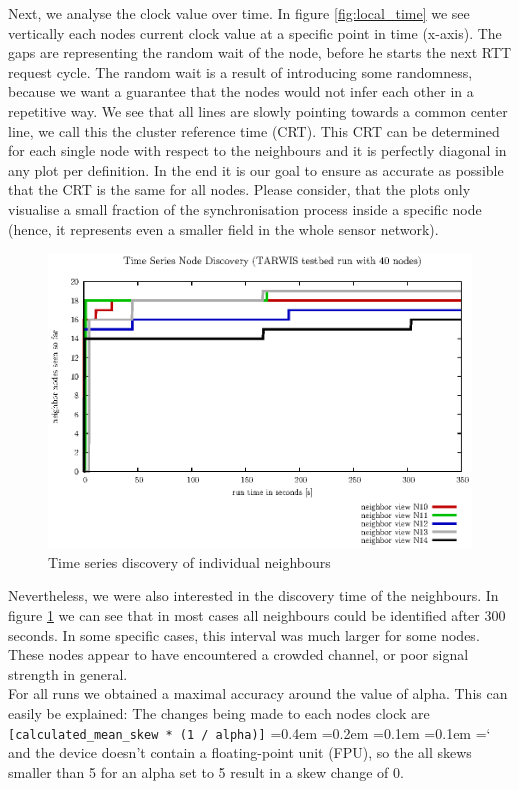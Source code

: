 \documentclass{llncs}
\newcommand{\code}[1]{%
	\texttt{#1}%
	\fontdimen2\font=0.4em
	\fontdimen3\font=0.2em
	\fontdimen4\font=0.1em
	\fontdimen7\font=0.1em
	\hyphenchar\font=`\-
}
\begin{document}
\noindent Next, we analyse the clock value over time. In figure \ref{fig:local_time} we see vertically each nodes current clock value at a specific point in time (x-axis). The gaps are representing the random wait of the node, before he starts the next RTT request cycle. The random wait is a result of introducing some randomness, because we want a guarantee that the nodes would not infer each other in a repetitive way. We see that all lines are slowly pointing towards a common center line, we call this the cluster reference time (CRT). This CRT can be determined for each single node with respect to the neighbours and it is perfectly diagonal in any plot per definition. In the end it is our goal to ensure as accurate as possible that the CRT is the same for all nodes. Please consider, that the plots only visualise a small fraction of the synchronisation process inside a specific node (hence, it represents even a smaller field in the whole sensor network).\\
\begin{figure}[H]
	\centering
	\includegraphics[scale=0.8]{images/FIG_04.eps}
	\caption{Time series discovery of individual neighbours}
	\label{fig:discovery}
\end{figure}
\noindent Nevertheless, we were also interested in the discovery time of the neighbours. In figure \ref{fig:discovery} we can see that in most cases all neighbours could be identified after 300 seconds. In some specific cases, this interval was much larger for some nodes. These nodes appear to have encountered a crowded channel, or poor signal strength in general.\\

\noindent For all runs we obtained a maximal accuracy around the value of alpha. This can easily be explained: The changes being made to each nodes clock are \code{[calculated\_mean\_skew * (1 / alpha)]} and the device doesn't contain a float\-ing-point unit (FPU), so the all skews smaller than 5 for an alpha set to 5 result in a skew change of 0.
\end{document}
